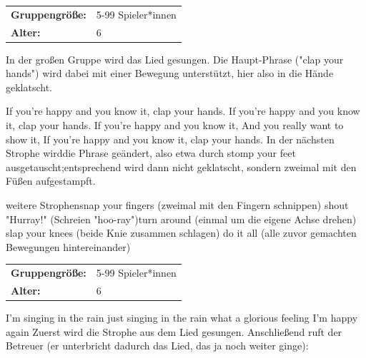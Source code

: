 \begin{table}[H]
\begin{tabular}{>{\bfseries}lp{8cm}}
   Gruppengröße:   & 5-99 Spieler*innen\\
    Alter: & 6 \\ 
\end{tabular}
\end{table} 


    In der großen Gruppe wird das Lied gesungen. Die Haupt-Phrase ("clap your hands") wird dabei mit einer Bewegung unterstützt, hier also in die Hände geklatscht. \newline 

If you're happy and you know it, clap your hands.\newline
If you're happy and you know it, clap your hands.\newline
If you're happy and you know it,\newline
And you really want to show it,\newline
If you're happy and you know it, clap your hands.\newline
In der nächsten Strophe wirddie Phrase geändert, also etwa durch stomp your feet ausgetauscht;\newline entsprechend wird dann nicht geklatscht, sondern zweimal mit den Füßen aufgestampft.\newline

weitere Strophensnap your fingers (zweimal mit den Fingern schnippen)\newline
shout "Hurray!" (Schreien "hoo-ray")turn around (einmal um die eigene Achse drehen)\newline
slap your knees (beide Knie zusammen schlagen)\newline
do it all (alle zuvor gemachten Bewegungen hintereinander)\newline
    \\



\begin{table}[H]
\begin{tabular}{>{\bfseries}lp{8cm}}
   Gruppengröße:   & 5-99 Spieler*innen\\
    Alter: & 6 \\ 
\end{tabular}
\end{table} 
I'm singing in the rain \newline
just singing in the rain\newline
what a glorious feeling\newline
I'm happy again\newline
\newline
Zuerst wird die Strophe aus dem Lied gesungen. Anschließend ruft der Betreuer (er unterbricht dadurch das Lied, das ja noch weiter ginge):\newline

